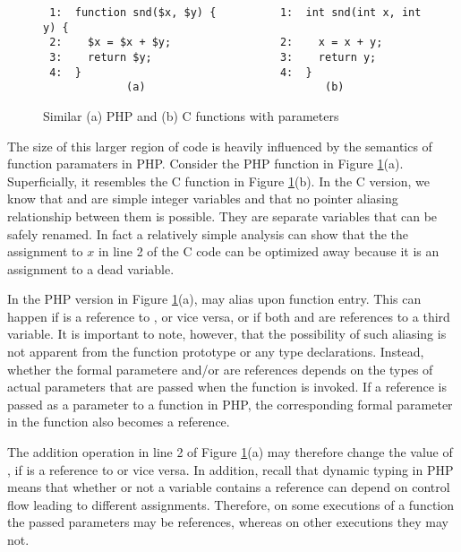 \begin{figure}[thp]
\begin{verbatim}
 1:  function snd($x, $y) {          1:  int snd(int x, int y) {
 2:    $x = $x + $y;                 2:    x = x + y;
 3:    return $y;                    3:    return y;
 4:  }                               4:  }
             (a)                            (b)
\end{verbatim}
\caption{Similar (a) PHP and (b) C functions with parameters}
\label{parameters}
\end{figure}

The size of this larger region of code is heavily influenced by the
semantics of function paramaters in PHP. Consider the PHP function in
Figure \ref{parameters}(a).
Superficially, it resembles the C function in Figure \ref{parameters}(b).
In the C version, we know that  and  are simple integer
variables and that no pointer aliasing relationship between them is
possible.  They are separate variables that can be safely renamed. In
fact a relatively simple analysis can show that the the assignment to
$x$ in line 2 of the C code can be optimized away because it is an
assignment to a dead variable.

In the PHP version in Figure \ref{parameters}(a),  may alias
 upon function entry. This can happen if  is a reference
to , or vice versa, or if both  and  are
references to a third variable. It is important to note, however, that
the possibility of such aliasing is not apparent from the function
prototype or any type declarations. Instead, whether the formal
parametere  and/or  are references depends on the types
of actual parameters that are passed when the function is invoked. If
a reference is passed as a parameter to a function in PHP, the
corresponding formal parameter in the function also becomes a
reference.

The addition operation in line 2 of Figure \ref{parameters}(a) may
therefore change the value of , if  is a reference to
 or vice versa. In addition, recall that dynamic typing in PHP
means that whether or not a variable contains a reference can depend
on control flow leading to different assignments. Therefore, on some
executions of a function the passed parameters may be references,
whereas on other executions they may not.


